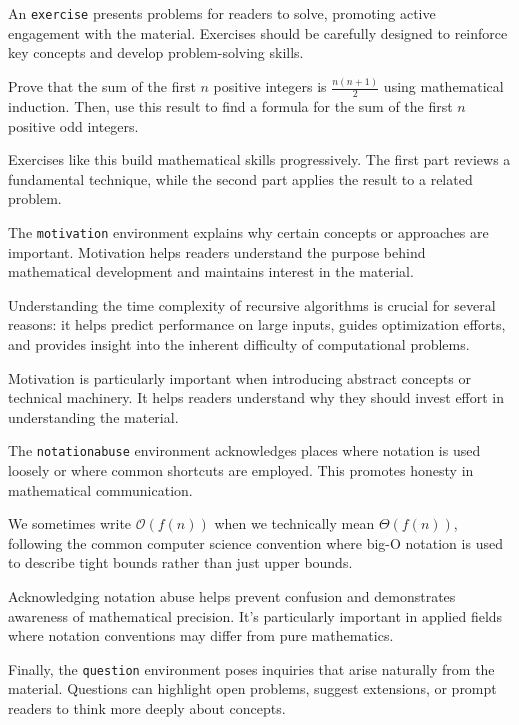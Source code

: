 \documentclass[9pt]{amsart}
\begin{document}
An \texttt{exercise} presents problems for readers to solve, promoting active
engagement with the material. Exercises should be carefully designed to
reinforce key concepts and develop problem-solving skills.

\begin{exercise}
    Prove that the sum of the first $n$ positive integers is $\frac{n(n+1)}{2}$ using mathematical induction. Then, use this result to find a formula for the sum of the first $n$ positive odd integers.
\end{exercise}

Exercises like this build mathematical skills progressively. The first part
reviews a fundamental technique, while the second part applies the result to a
related problem.

The \texttt{motivation} environment explains why certain concepts or approaches
are important. Motivation helps readers understand the purpose behind
mathematical development and maintains interest in the material.

\begin{motivation}
    Understanding the time complexity of recursive algorithms is crucial for several reasons: it helps predict performance on large inputs, guides optimization efforts, and provides insight into the inherent difficulty of computational problems.
\end{motivation}

Motivation is particularly important when introducing abstract concepts or
technical machinery. It helps readers understand why they should invest effort
in understanding the material.

The \texttt{notationabuse} environment acknowledges places where notation is
used loosely or where common shortcuts are employed. This promotes honesty in
mathematical communication.

\begin{notationabuse}
    We sometimes write $\mathcal{O}(f(n))$ when we technically mean $\Theta(f(n))$, following the common computer science convention where big-O notation is used to describe tight bounds rather than just upper bounds.
\end{notationabuse}

Acknowledging notation abuse helps prevent confusion and demonstrates awareness
of mathematical precision. It's particularly important in applied fields where
notation conventions may differ from pure mathematics.

Finally, the \texttt{question} environment poses inquiries that arise naturally
from the material. Questions can highlight open problems, suggest extensions,
or prompt readers to think more deeply about concepts.
\end{document}
